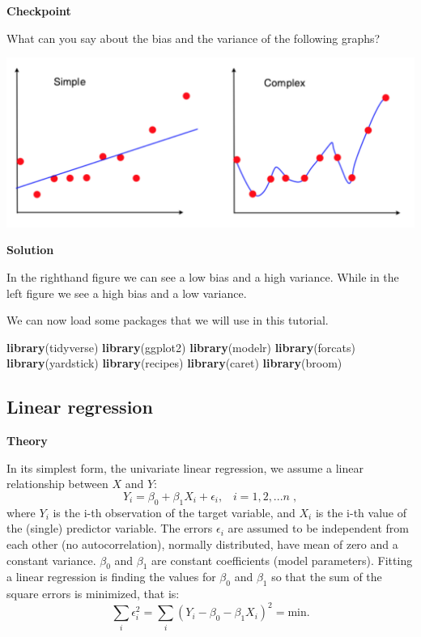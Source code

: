 \documentclass[
]{book}
\newenvironment{Shaded}{\begin{snugshade}}{\end{snugshade}}
\newcommand{\KeywordTok}[1]{\textcolor[rgb]{0.13,0.29,0.53}{\textbf{#1}}}
\newcommand{\NormalTok}[1]{#1}
\begin{document}
\textbf{Checkpoint}

What can you say about the bias and the variance of the following graphs?

\includegraphics{./figures/bias-variance_2.png}

\textbf{Solution}

In the righthand figure we can see a low bias and a high variance. While in the left figure we see a high bias and a low variance.

We can now load some packages that we will use in this tutorial.

\begin{Shaded}
\begin{Highlighting}[]
\KeywordTok{library}\NormalTok{(tidyverse)}
\KeywordTok{library}\NormalTok{(ggplot2)}
\KeywordTok{library}\NormalTok{(modelr)}
\KeywordTok{library}\NormalTok{(forcats)}
\KeywordTok{library}\NormalTok{(yardstick)}
\KeywordTok{library}\NormalTok{(recipes)}
\KeywordTok{library}\NormalTok{(caret)}
\KeywordTok{library}\NormalTok{(broom)}
\end{Highlighting}
\end{Shaded}

\hypertarget{linear-regression}{%
\subsection{Linear regression}\label{linear-regression}}

\textbf{Theory}

In its simplest form, the univariate linear regression, we assume a linear relationship between \(X\) and \(Y\):
\[
Y_i = \beta_0 + \beta_1 X_i + \epsilon_i, \;\;\; i = 1, 2, ...n \;,
\]
where \(Y_i\) is the i-th observation of the target variable, and \(X_i\) is the i-th value of the (single) predictor variable. The errors \(\epsilon_i\) are assumed to be independent from each other (no autocorrelation), normally distributed, have mean of zero and a constant variance. \(\beta_0\) and \(\beta_1\) are constant coefficients (model parameters). Fitting a linear regression is finding the values for \(\beta_0\) and \(\beta_1\) so that the sum of the square errors is minimized, that is:
\[
\sum_i \epsilon_i^2 = \sum_i (Y_i - \beta_0 - \beta_1 X_i)^2 = \text{min}.
\]
\end{document}
